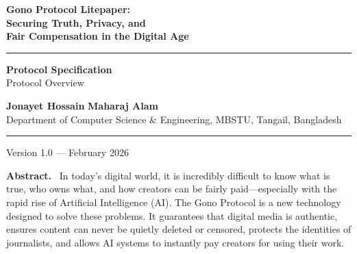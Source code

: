 \documentclass[12pt, a4paper]{article}
\begin{document}
\begin{titlepage}
  \centering
  \vspace*{1.5cm}

  {\Huge\bfseries\color{primary}
    Gono Protocol Litepaper:\\[0.4em]
    Securing Truth, Privacy, and\\[0.4em]
    Fair Compensation in the Digital Age
  \par}

  \vspace{1.2cm}
  \noindent\rule{\linewidth}{1.5pt}
  \vspace{0.6cm}

  {\large\color{darkgray}
    \textbf{Protocol Specification}\\[0.3em]
    Protocol Overview
  \par}

  \vspace{1.2cm}

  {\normalsize
    \textbf{Jonayet Hossain} \quad \textbf{Maharaj Alam} \\[0.5em]
    {\small Department of Computer Science \& Engineering, MBSTU, Tangail, Bangladesh}
  \par}

  \vspace{0.8cm}
  \noindent\rule{\linewidth}{0.5pt}
  \vspace{0.4cm}

  {\small\color{darkgray}
    Version 1.0 --- February 2026
  \par}

  \vfill

  \begin{notebox}
    \small\centering
    \textbf{Abstract.}~
    In today's digital world, it is incredibly difficult to know what is true, who owns what, and how creators can be fairly paid---especially with the rapid rise of Artificial Intelligence (AI). The Gono Protocol is a new technology designed to solve these problems. It guarantees that digital media is authentic, ensures content can never be quietly deleted or censored, protects the identities of journalists, and allows AI systems to instantly pay creators for using their work.
  \end{notebox}

\end{titlepage}

\newpage
\end{document}
